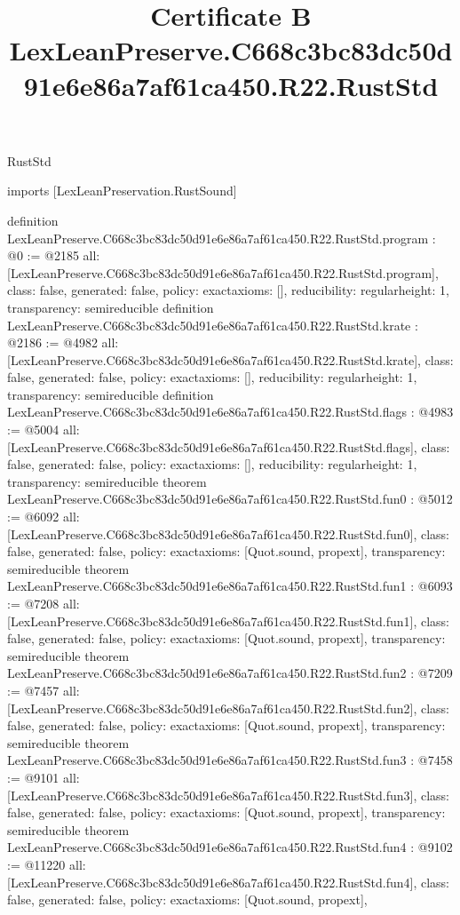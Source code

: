 \begin{lexlean}{RustStd}
\title{Certificate B LexLeanPreserve.C668c3bc83dc50d91e6e86a7af61ca450.R22.RustStd}
\begin{coremodule}
imports [LexLeanPreservation.RustSound]

definition LexLeanPreserve.C668c3bc83dc50d91e6e86a7af61ca450.R22.RustStd.program : @0 := @2185 {
  all: [LexLeanPreserve.C668c3bc83dc50d91e6e86a7af61ca450.R22.RustStd.program],
  class: false,
  generated: false,
  policy: exact{axioms: []},
  reducibility: regular{height: 1},
  transparency: semireducible
}
definition LexLeanPreserve.C668c3bc83dc50d91e6e86a7af61ca450.R22.RustStd.krate : @2186 := @4982 {
  all: [LexLeanPreserve.C668c3bc83dc50d91e6e86a7af61ca450.R22.RustStd.krate],
  class: false,
  generated: false,
  policy: exact{axioms: []},
  reducibility: regular{height: 1},
  transparency: semireducible
}
definition LexLeanPreserve.C668c3bc83dc50d91e6e86a7af61ca450.R22.RustStd.flags : @4983 := @5004 {
  all: [LexLeanPreserve.C668c3bc83dc50d91e6e86a7af61ca450.R22.RustStd.flags],
  class: false,
  generated: false,
  policy: exact{axioms: []},
  reducibility: regular{height: 1},
  transparency: semireducible
}
theorem LexLeanPreserve.C668c3bc83dc50d91e6e86a7af61ca450.R22.RustStd.fun0 : @5012 := @6092 {
  all: [LexLeanPreserve.C668c3bc83dc50d91e6e86a7af61ca450.R22.RustStd.fun0],
  class: false,
  generated: false,
  policy: exact{axioms: [Quot.sound, propext]},
  transparency: semireducible
}
theorem LexLeanPreserve.C668c3bc83dc50d91e6e86a7af61ca450.R22.RustStd.fun1 : @6093 := @7208 {
  all: [LexLeanPreserve.C668c3bc83dc50d91e6e86a7af61ca450.R22.RustStd.fun1],
  class: false,
  generated: false,
  policy: exact{axioms: [Quot.sound, propext]},
  transparency: semireducible
}
theorem LexLeanPreserve.C668c3bc83dc50d91e6e86a7af61ca450.R22.RustStd.fun2 : @7209 := @7457 {
  all: [LexLeanPreserve.C668c3bc83dc50d91e6e86a7af61ca450.R22.RustStd.fun2],
  class: false,
  generated: false,
  policy: exact{axioms: [Quot.sound, propext]},
  transparency: semireducible
}
theorem LexLeanPreserve.C668c3bc83dc50d91e6e86a7af61ca450.R22.RustStd.fun3 : @7458 := @9101 {
  all: [LexLeanPreserve.C668c3bc83dc50d91e6e86a7af61ca450.R22.RustStd.fun3],
  class: false,
  generated: false,
  policy: exact{axioms: [Quot.sound, propext]},
  transparency: semireducible
}
theorem LexLeanPreserve.C668c3bc83dc50d91e6e86a7af61ca450.R22.RustStd.fun4 : @9102 := @11220 {
  all: [LexLeanPreserve.C668c3bc83dc50d91e6e86a7af61ca450.R22.RustStd.fun4],
  class: false,
  generated: false,
  policy: exact{axioms: [Quot.sound, propext]},
}
\end{coremodule}
\end{lexlean}
